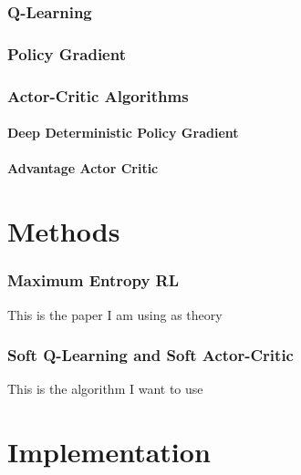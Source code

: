\documentclass[a4paper]{report}
\begin{document}
\subsection{Q-Learning}

\subsection{Policy Gradient}

\subsection{Actor-Critic Algorithms}
\subsubsection{Deep Deterministic Policy Gradient}
\subsubsection{Advantage Actor Critic}








\chapter{Methods}
\label{ch:methods}

\subsection{Maximum Entropy RL}

This is the paper I am using as theory
\cite{LevineS18:journals/corr/abs-1805-00909}



\subsection{Soft Q-Learning and Soft Actor-Critic}


\cite{Haaronja17}

This is the algorithm I want to use 
\cite{Haaronja18}








\chapter{Implementation}
\label{ch:implimentation}
\end{document}
